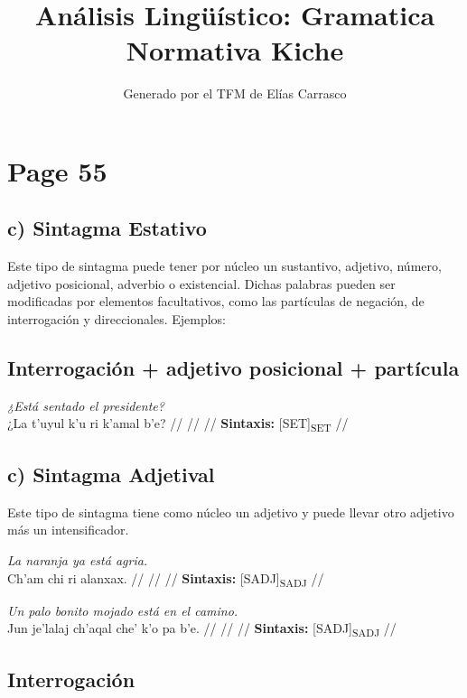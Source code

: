 \documentclass{article}%
\title{Análisis Lingüístico: Gramatica Normativa Kiche}%
\author{Generado por el TFM de Elías Carrasco}%
\begin{document}
%
\normalsize%
\maketitle%
\section{Page 55}%
\label{sec:Page55}%
\subsection{c) Sintagma Estativo}%
\label{subsec:c)SintagmaEstativo}%

%
Este tipo de sintagma puede tener por núcleo un sustantivo, adjetivo, número, adjetivo %
posicional, adverbio o existencial. Dichas palabras pueden ser modificadas por %
elementos facultativos, como las partículas de negación, de interrogación y direccionales. %
Ejemplos: %
\subsection{Interrogación + adjetivo posicional + partícula}%
\label{subsec:Interrogacin+adjetivoposicional+partcula}%

%
\par\medskip%
\ex
\textit{¿Está sentado el presidente?} \\
\begingl
\gla ¿La t’uyul k’u ri k’amal b’e? //
\glb  //
\glc  //
\glft \textbf{Sintaxis:} [SET]\textsubscript{SET} //
\endgl
\xe
%
\medskip%
\subsection{c) Sintagma Adjetival}%
\label{subsec:c)SintagmaAdjetival}%

%
Este tipo de sintagma tiene como núcleo un adjetivo y puede llevar otro adjetivo más un %
intensificador. %
\par\medskip%
\ex
\textit{La naranja ya está agria.} \\
\begingl
\gla Ch'am chi ri alanxax. //
\glb  //
\glc  //
\glft \textbf{Sintaxis:} [SADJ]\textsubscript{SADJ} //
\endgl
\xe
%
\medskip%
\par\medskip%
\ex
\textit{Un palo bonito mojado está en el camino.} \\
\begingl
\gla Jun je’lalaj ch’aqal che' k'o pa b’e. //
\glb  //
\glc  //
\glft \textbf{Sintaxis:} [SADJ]\textsubscript{SADJ} //
\endgl
\xe
%
\medskip%
\subsection{Interrogación}%
\label{subsec:Interrogacin}%
\end{document}
